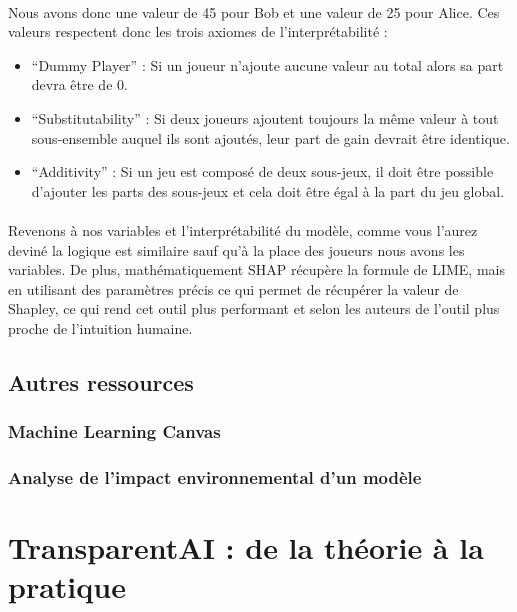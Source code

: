 \documentclass[10pt, french, a4paper]{report}
\begin{document}
\paragraph{}
Nous avons donc une valeur de 45 pour Bob et une valeur de 25 pour Alice. Ces valeurs respectent donc les trois axiomes de l’interprétabilité :
\begin{itemize}
  \item ``Dummy Player'' : Si un joueur n’ajoute aucune valeur au total alors sa part devra être de 0.
  \item ``Substitutability'' : Si deux joueurs ajoutent toujours la même valeur à tout sous-ensemble auquel ils sont ajoutés, leur part de gain devrait être identique.
  \item ``Additivity'' : Si un jeu est composé de deux sous-jeux, il doit être possible d’ajouter les parts des sous-jeux et cela doit être égal à la part du jeu global.
\end{itemize}

\paragraph{}
Revenons à nos variables et l’interprétabilité du modèle, comme vous l’aurez deviné la logique est similaire sauf qu’à la place des joueurs nous avons les variables. De plus, mathématiquement SHAP récupère la formule de LIME, mais en utilisant des paramètres précis ce qui permet de récupérer la valeur de Shapley, ce qui rend cet outil plus performant et selon les auteurs de l’outil plus proche de l’intuition humaine.

\subsection{Autres ressources}

\subsubsection{Machine Learning Canvas}

\subsubsection{Analyse de l'impact environnemental d'un modèle}

\section{TransparentAI : de la théorie à la pratique}
\end{document}
